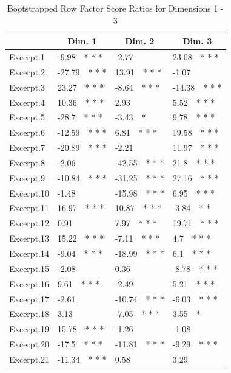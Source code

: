 \documentclass[
]{article}
\begin{document}
\begin{table}[tbp]

\begin{center}
\begin{threeparttable}

\caption{\label{tab:A.booti.table}Bootstrapped Row Factor Score Ratios for Dimensions 1 - 3}

\begin{tabular}{llll}
\toprule
 & \multicolumn{1}{c}{Dim.  1} & \multicolumn{1}{c}{Dim.  2} & \multicolumn{1}{c}{Dim.  3}\\
\midrule
Excerpt.1 & -9.98\ \ * * * & -2.77 & 23.08\ \ * * *\\
Excerpt.2 & -27.79\ \ * * * & 13.91\ \ * * * & -1.07\\
Excerpt.3 & 23.27\ \ * * * & -8.64\ \ * * * & -14.38\ \ * * *\\
Excerpt.4 & 10.36\ \ * * * & 2.93 & 5.52\ \ * * *\\
Excerpt.5 & -28.7\ \ * * * & -3.43\ \ * & 9.78\ \ * * *\\
Excerpt.6 & -12.59\ \ * * * & 6.81\ \ * * * & 19.58\ \ * * *\\
Excerpt.7 & -20.89\ \ * * * & -2.21 & 11.97\ \ * * *\\
Excerpt.8 & -2.06 & -42.55\ \ * * * & 21.8\ \ * * *\\
Excerpt.9 & -10.84\ \ * * * & -31.25\ \ * * * & 27.16\ \ * * *\\
Excerpt.10 & -1.48 & -15.98\ \ * * * & 6.95\ \ * * *\\
Excerpt.11 & 16.97\ \ * * * & 10.87\ \ * * * & -3.84\ \ * *\\
Excerpt.12 & 0.91 & 7.97\ \ * * * & 19.71\ \ * * *\\
Excerpt.13 & 15.22\ \ * * * & -7.11\ \ * * * & 4.7\ \ * * *\\
Excerpt.14 & -9.04\ \ * * * & -18.99\ \ * * * & 6.1\ \ * * *\\
Excerpt.15 & -2.08 & 0.36 & -8.78\ \ * * *\\
Excerpt.16 & 9.61\ \ * * * & -2.49 & 5.21\ \ * * *\\
Excerpt.17 & -2.61 & -10.74\ \ * * * & -6.03\ \ * * *\\
Excerpt.18 & 3.13 & -7.05\ \ * * * & 3.55\ \ *\\
Excerpt.19 & 15.78\ \ * * * & -1.26 & -1.08\\
Excerpt.20 & -17.5\ \ * * * & -11.81\ \ * * * & -9.29\ \ * * *\\
Excerpt.21 & -11.34\ \ * * * & 0.58 & 3.29\\

\end{tabular}
\end{threeparttable}
\end{center}
\end{table}
\end{document}
